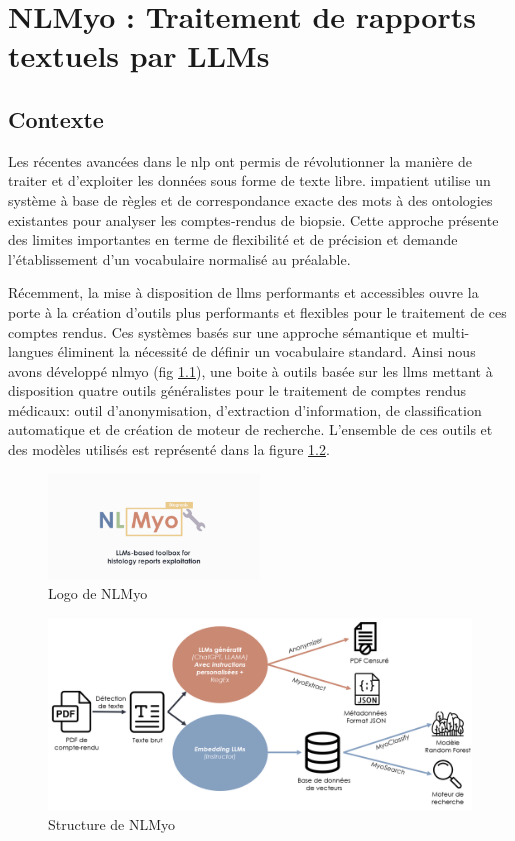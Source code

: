 \chapter{NLMyo : Traitement de rapports textuels par LLMs}

\section{Contexte}
Les récentes avancées dans le \gls{nlp} ont permis de révolutionner la manière de traiter et d'exploiter les données sous forme de texte libre. \gls{impatient} utilise un système à base de règles et de correspondance exacte des mots à des ontologies existantes pour analyser les comptes-rendus de biopsie. Cette approche présente des limites importantes en terme de flexibilité et de précision et demande l'établissement d'un vocabulaire normalisé au préalable. 

Récemment, la mise à disposition de \gls{llms} performants et accessibles ouvre la porte à la création d'outils plus performants et flexibles pour le traitement de ces comptes rendus. Ces systèmes basés sur une approche sémantique et multi-langues éliminent la nécessité de définir un vocabulaire standard. Ainsi nous avons développé \gls{nlmyo} (fig \ref{fig:nlmyo_logo}), une boite à outils basée sur les \gls{llms} mettant à disposition quatre outils généralistes pour le traitement de comptes rendus médicaux: outil d'anonymisation, d'extraction d'information, de classification automatique et de création de moteur de recherche. L'ensemble de ces outils et des modèles utilisés est représenté dans la figure \ref{fig:nlmyo_struct}.
\begin{figure}[!ht]
 \centering
 \includegraphics[width=0.5\textwidth]{figures/nlmyo_banner.png}
 \caption[Logo NLMyo]{Logo de NLMyo}
 \label{fig:nlmyo_logo}
\end{figure}
\begin{figure}[!ht]
 \centering
 \includegraphics[width=1\textwidth]{figures/nlmyo_struct.png}
 \caption[Structure de NLMyo]{Structure de NLMyo}
 \label{fig:nlmyo_struct}
\end{figure}
